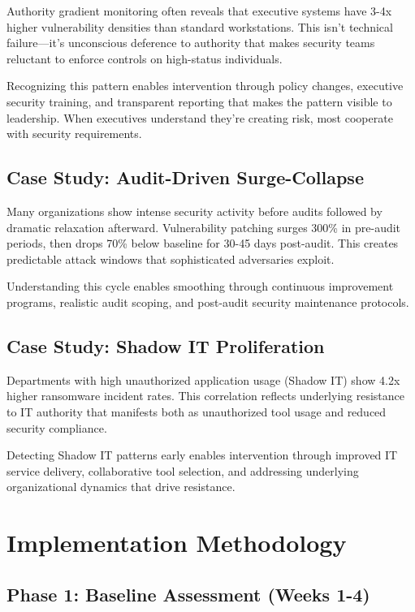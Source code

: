\documentclass[11pt,a4paper]{article}
\begin{document}
Authority gradient monitoring often reveals that executive systems have 3-4x higher vulnerability densities than standard workstations. This isn't technical failure—it's unconscious deference to authority that makes security teams reluctant to enforce controls on high-status individuals.

Recognizing this pattern enables intervention through policy changes, executive security training, and transparent reporting that makes the pattern visible to leadership. When executives understand they're creating risk, most cooperate with security requirements.

\subsection{Case Study: Audit-Driven Surge-Collapse}

Many organizations show intense security activity before audits followed by dramatic relaxation afterward. Vulnerability patching surges 300\% in pre-audit periods, then drops 70\% below baseline for 30-45 days post-audit. This creates predictable attack windows that sophisticated adversaries exploit.

Understanding this cycle enables smoothing through continuous improvement programs, realistic audit scoping, and post-audit security maintenance protocols.

\subsection{Case Study: Shadow IT Proliferation}

Departments with high unauthorized application usage (Shadow IT) show 4.2x higher ransomware incident rates. This correlation reflects underlying resistance to IT authority that manifests both as unauthorized tool usage and reduced security compliance.

Detecting Shadow IT patterns early enables intervention through improved IT service delivery, collaborative tool selection, and addressing underlying organizational dynamics that drive resistance.

\section{Implementation Methodology}

\subsection{Phase 1: Baseline Assessment (Weeks 1-4)}
\end{document}
